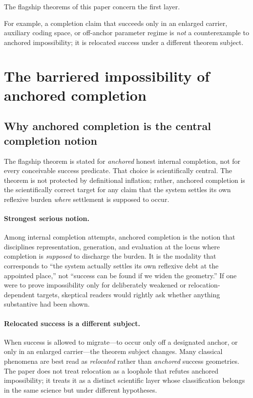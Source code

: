 \documentclass[11pt]{article}
\theoremstyle{plain}
\theoremstyle{definition}
\theoremstyle{remark}
\begin{document}
The flagship theorems of this paper concern the first layer.

For example, a completion claim that succeeds only in an enlarged carrier, auxiliary coding space, or off-anchor parameter regime is \emph{not} a counterexample to anchored impossibility; it is relocated success under a different theorem subject.

\section{The barriered impossibility of anchored completion}

\subsection{Why anchored completion is the central completion notion}

The flagship theorem is stated for \emph{anchored} honest internal completion, not for every conceivable success predicate. That choice is scientifically central. The theorem is not protected by definitional inflation; rather, anchored completion is the scientifically correct target for any claim that the system settles its own reflexive burden \emph{where} settlement is supposed to occur.

\paragraph{Strongest serious notion.}
Among internal completion attempts, anchored completion is the notion that disciplines representation, generation, and evaluation at the locus where completion is \emph{supposed} to discharge the burden. It is the modality that corresponds to ``the system actually settles its own reflexive debt at the appointed place,'' not ``success can be found if we widen the geometry.'' If one were to prove impossibility only for deliberately weakened or relocation-dependent targets, skeptical readers would rightly ask whether anything substantive had been shown.

\paragraph{Relocated success is a different subject.}
When success is allowed to migrate---to occur only off a designated anchor, or only in an enlarged carrier---the theorem subject changes. Many classical phenomena are best read as \emph{relocated} rather than \emph{anchored} success geometries. The paper does not treat relocation as a loophole that refutes anchored impossibility; it treats it as a distinct scientific layer whose classification belongs in the same science but under different hypotheses.
\end{document}
